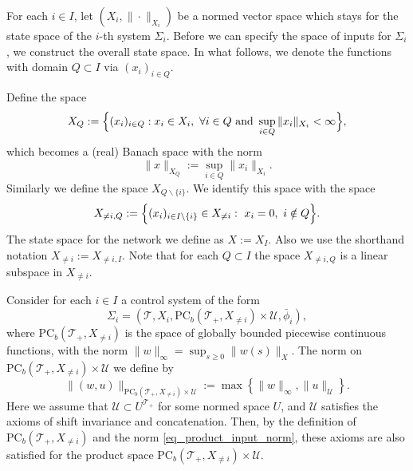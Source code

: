 \documentclass[twocolumn]{IEEEtran} %
\theoremstyle{definition}
\newcommand{\tm}{\times}%
\newcommand{\Uc}{\mathcal{U}}%
\newcommand{\PC}{\mathrm{PC}}%
\newcommand{\T}{\ensuremath{\mathcal{T}}}  %
\begin{document}
For each $i \in I$, let $(X_i,\|\cdot\|_{X_i})$ be a normed vector space which stays for the state space of the $i$-th system $\Sigma_i$. Before we can specify the space of inputs for $\Sigma_i$, we construct the overall state space. In what follows, we denote the functions with domain $Q\subset I$ via $(x_i)_{i \in Q}$. 

Define the space
\begin{equation*}
  X_Q := \Bigl\{ (x_i)_{i \in Q} : x_i \in X_i,\ \forall i \in Q \mbox{ and } \sup_{i \in Q} \|x_i\|_{X_i} < \infty \Bigr\},%
\end{equation*}
which becomes a (real) Banach space with the norm%
\begin{equation*}
  \|x\|_{X_Q} := \sup_{i\in Q}\|x_i\|_{X_i}.%
\end{equation*}
Similarly we define the space $X_{Q\backslash\{i\}}$. We identify this space with the space
\[
X_{\neq i,Q}:=\Bigl\{ (x_i)_{i \in I\backslash\{i\}} \in X_{\neq i} : \  x_i=0,\ i \notin Q\Bigr\}.
\]
The state space for the network we define as $X:=X_I$. Also we use the shorthand notation $X_{\neq i}:=X_{\neq i,I}$.
Note that for each $Q\subset I$ the space $X_{\neq i,Q}$  is a linear subspace in $X_{\neq i}$.

%

Consider for each $i \in I$ a control system of the form%
\begin{equation}
\label{eq:Sigma-i}
  \Sigma_i = (\T, X_i,\PC_b(\T_+,X_{\neq i}) \tm \Uc,\bar{\phi}_i),%
\end{equation}
where $\PC_b(\T_+,X_{\neq i})$ is the space of globally bounded piecewise continuous functions, with the norm $\|w\|_{\infty} = \sup_{s \geq 0}\|w(s)\|_X$. The norm on $\PC_b(\T_+,X_{\neq i}) \tm \Uc$ we define by%
\begin{equation}\label{eq_product_input_norm}
  \|(w,u)\|_{\PC_b(\T_+,X_{\neq i}) \tm \Uc} := \max\left\{ \|w\|_{\infty}, \|u\|_{\Uc} \right\}.%
\end{equation}
Here we assume that $\Uc \subset U^{\T_+}$ for some normed space $U$, and $\Uc$ satisfies the axioms of shift invariance and concatenation. Then, by the definition of $\PC_b(\T_+,X_{\neq i})$ and the norm \eqref{eq_product_input_norm}, these axioms are also satisfied for the product space $\PC_b(\T_+,X_{\neq i}) \tm \Uc$.%
\end{document}
